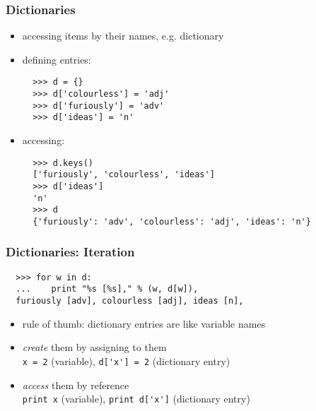 \documentclass[handout]{beamer}
\begin{document}
\begin{frame}[fragile]
  \frametitle{Dictionaries}
  \small

\begin{itemize}
\item accessing items by their names, e.g. dictionary
\item defining entries:

\begin{verbatim}
  >>> d = {}
  >>> d['colourless'] = 'adj'
  >>> d['furiously'] = 'adv'
  >>> d['ideas'] = 'n'
\end{verbatim}

\item accessing:

\begin{verbatim}
  >>> d.keys()
  ['furiously', 'colourless', 'ideas']
  >>> d['ideas']
  'n'
  >>> d
  {'furiously': 'adv', 'colourless': 'adj', 'ideas': 'n'}
\end{verbatim}
\end{itemize}
\end{frame}

\begin{frame}[fragile]
\frametitle{Dictionaries: Iteration}

\begin{verbatim}
  >>> for w in d:
  ...    print "%s [%s]," % (w, d[w]),
  furiously [adv], colourless [adj], ideas [n],
\end{verbatim}

\begin{itemize}
\item rule of thumb: dictionary entries are like variable names
\item \textit{create} them by assigning to them\\
  \verb|x = 2| (variable), \verb|d['x'] = 2| (dictionary entry)
\item \textit{access} them by reference\\
  \verb|print x| (variable), \verb|print d['x']| (dictionary entry)
\end{itemize}
\end{frame}
\end{document}
